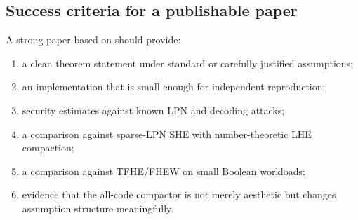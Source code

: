 \subsection{Success criteria for a publishable paper}

A strong paper based on \sable{} should provide:
\begin{enumerate}
    \item a clean theorem statement under standard or carefully justified assumptions;
    \item an implementation that is small enough for independent reproduction;
    \item security estimates against known LPN and decoding attacks;
    \item a comparison against sparse-LPN SHE with number-theoretic LHE compaction;
    \item a comparison against TFHE/FHEW on small Boolean workloads;
    \item evidence that the all-code compactor is not merely aesthetic but changes assumption structure meaningfully.
\end{enumerate}
